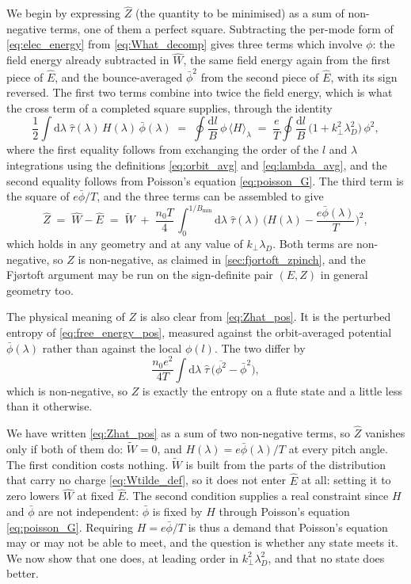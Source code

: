 \documentclass{jpp}
\newcommand{\rmd}{\text{d}}
\newcommand{\kperp}{k_\perp}
\newcommand{\lambdaD}{\lambda_D}
\newcommand{\Zhat}{\hat{Z}}
\newcommand{\lavg}[1]{\langle #1 \rangle_\lambda}
\begin{document}
We begin by expressing $\hat Z$ (the quantity to be minimised) as a sum of non-negative terms, one of them a perfect square. Subtracting the per-mode form of \cref{eq:elec_energy} from \cref{eq:What_decomp} gives three terms which involve $\phi$: the field energy already subtracted in $\hat W$, the same field energy again from the first piece of $\hat E$, and the bounce-averaged $\bar\phi^2$ from the second piece of $\hat E$, with its sign reversed. The first two terms combine into twice the field energy, which is what the cross term of a completed square supplies, through the identity
\begin{equation}\label{eq:cross_term}
\frac{1}{2}\int \rmd\lambda\; \hat\tau(\lambda)\, H(\lambda)\, \bar\phi(\lambda)
\;=\; \oint \frac{\rmd l}{B}\,\phi\, \lavg{H}
\;=\; \frac{e}{T}\oint \frac{\rmd l}{B}\,\bigl(1 + \kperp^2\lambdaD^2\bigr)\,\phi^2 ,
\end{equation}
where the first equality follows from exchanging the order of the $l$ and $\lambda$ integrations using the definitions \cref{eq:orbit_avg} and \cref{eq:lambda_avg}, and the second equality follows from Poisson's equation \cref{eq:poisson_G}. The third term is the square of $e\bar\phi/T$, and the three terms can be assembled to give
\begin{equation}\label{eq:Zhat_pos}
\Zhat \;=\; \hat W - \hat E \;=\; \tilde W \;+\; \frac{n_0 T}{4}\,\int_0^{1/B_\mathrm{min}}\!\rmd\lambda\; \hat\tau(\lambda)\,\biggl(H(\lambda) - \frac{e\bar\phi(\lambda)}{T}\biggr)^{\!2},
\end{equation}
which holds in any geometry and at any value of $\kperp\lambdaD$. Both terms are non-negative, so $Z$ is non-negative, as claimed in \cref{sec:fjortoft_zpinch}, and the Fj\o rtoft argument may be run on the sign-definite pair $(E, Z)$ in general geometry too.

The physical meaning of $Z$ is also clear from \cref{eq:Zhat_pos}. It is the perturbed entropy of \cref{eq:free_energy_pos}, measured against the orbit-averaged potential $\bar\phi(\lambda)$ rather than against the local $\phi(l)$. The two differ by
\begin{equation}
\frac{n_0 e^2}{4T}\int\rmd\lambda\;\hat\tau\,\bigl(\overline{\phi^2} - \bar\phi^2\bigr) ,
\end{equation}
which is non-negative, so $Z$ is exactly the entropy on a flute state and a little less than it otherwise.

We have written \cref{eq:Zhat_pos} as a sum of two non-negative terms, so $\Zhat$ vanishes only if both of them do: $\tilde W = 0$, and $H(\lambda) = e\bar\phi(\lambda)/T$ at every pitch angle. The first condition costs nothing. $\tilde W$ is built from the parts of the distribution that carry no charge \cref{eq:Wtilde_def}, so it does not enter $\hat E$ at all: setting it to zero lowers $\hat W$ at fixed $\hat E$. The second condition supplies a real constraint since $H$ and $\bar\phi$ are not independent: $\bar\phi$ is fixed by $H$ through Poisson's equation \cref{eq:poisson_G}. Requiring $H = e\bar\phi/T$ is thus a demand that Poisson's equation may or may not be able to meet, and the question is whether any state meets it. We now show that one does, at leading order in $\kperp^2\lambdaD^2$, and that no state does better. 
\end{document}
